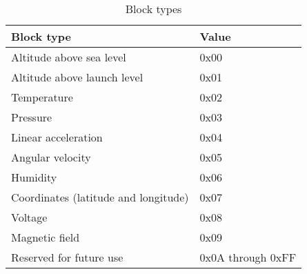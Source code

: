 \begin{table}[H]
    \centering
    \begin{tabular}{@{}ll@{}}
        \toprule
        Block type                           & Value             \\
        \midrule
        Altitude above sea level             & 0x00              \\
        Altitude above launch level          & 0x01              \\
        Temperature                          & 0x02              \\
        Pressure                             & 0x03              \\
        Linear acceleration                  & 0x04              \\
        Angular velocity                     & 0x05              \\
        Humidity                             & 0x06              \\
        Coordinates (latitude and longitude) & 0x07              \\
        Voltage                              & 0x08              \\
        Magnetic field                       & 0x09              \\
        Reserved for future use              & 0x0A through 0xFF \\
        \bottomrule
    \end{tabular}
    \caption{Block types}
    \label{table:block-types}
\end{table}
